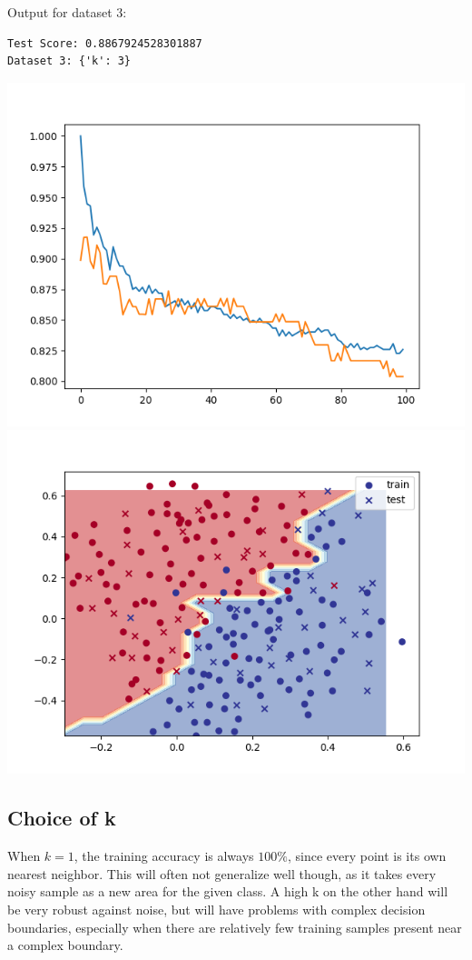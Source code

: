     Output for dataset 3:
    \begin{verbatim}
Test Score: 0.8867924528301887
Dataset 3: {'k': 3}
    \end{verbatim}
    \includegraphics[width=\textwidth / 2]{plots/kmeans_loss_3}
    \includegraphics[width=\textwidth / 2]{plots/kmeans_boundary_3}

    \subsection{Choice of k}
    When $k=1$, the training accuracy is always $100\%$,
    since every point is its own nearest neighbor.
    This will often not generalize well though, as it takes every noisy sample as a new area for the given class.
    A high k on the other hand will be very robust against noise, but will have problems with complex decision boundaries,
    especially when there are relatively few training samples present near a complex boundary.

